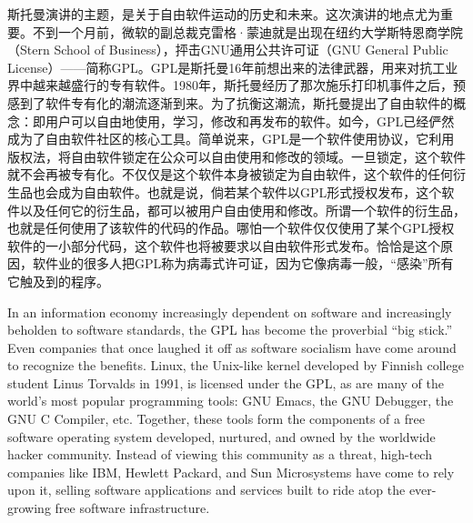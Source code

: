 \ifdefined\chs
斯托曼演讲的主题，是关于自由软件运动的历史和未来。这次演讲的地点尤为重要。不到一个月前，微软的副总裁克雷格·蒙迪就是出现在纽约大学斯特恩商学院（Stern School of Business），抨击GNU通用公共许可证（GNU General Public License）——简称GPL。GPL是斯托曼16年前想出来的法律武器，用来对抗工业界中越来越盛行的专有软件。1980年，斯托曼经历了那次施乐打印机事件之后，预感到了软件专有化的潮流逐渐到来。为了抗衡这潮流，斯托曼提出了自由软件的概念：即用户可以自由地使用，学习，修改和再发布的软件。如今，GPL已经俨然成为了自由软件社区的核心工具。简单说来，GPL是一个软件使用协议，它利用版权法，将自由软件锁定在公众可以自由使用和修改的领域。一旦锁定，这个软件就不会再被专有化。不仅仅是这个软件本身被锁定为自由软件，这个软件的任何衍生品也会成为自由软件。也就是说，倘若某个软件以GPL形式授权发布，这个软件以及任何它的衍生品，都可以被用户自由使用和修改。所谓一个软件的衍生品，也就是任何使用了该软件的代码的作品。哪怕一个软件仅仅使用了某个GPL授权软件的一小部分代码，这个软件也将被要求以自由软件形式发布。恰恰是这个原因，软件业的很多人把GPL称为病毒式许可证，因为它像病毒一般，“感染”所有它触及到的程序。


\fi

\ifdefined\eng
In an information economy increasingly dependent on software and increasingly beholden to software standards, the GPL has become the proverbial ``big stick.'' Even companies that once laughed it off as software socialism have come around to recognize the benefits. Linux, the Unix-like kernel developed by Finnish college student Linus Torvalds in 1991, is licensed under the GPL, as are many of the world's most popular programming tools: GNU Emacs, the GNU Debugger, the GNU C Compiler, etc. Together, these tools form the components of a free software operating system developed, nurtured, and owned by the worldwide hacker community. Instead of viewing this community as a threat, high-tech companies like IBM, Hewlett Packard, and Sun Microsystems have come to rely upon it, selling software applications and services built to ride atop the ever-growing free software infrastructure.
\fi

